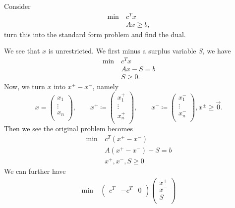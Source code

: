 \begin{eg}
	Consider
	\begin{align*}
		\min~ & c^Tx       \\
		      & Ax \geq b,
	\end{align*}
	turn this into the standard form problem and find the dual.

	We see that \(x\) is unrestricted. We first minus a surplus variable \(S\), we have
	\begin{align*}
		\min~ & c^Tx      \\
		      & Ax - S= b \\
		      & S \geq 0.
	\end{align*}
	Now, we turn \(x\) into \(x^+ - x^-\), namely
	\[
		x = \begin{pmatrix}
			x_1    \\
			\vdots \\
			x_n    \\
		\end{pmatrix},\qquad
		x^+ \coloneqq \begin{pmatrix}
			x^+_1  \\
			\vdots \\
			x^+_n  \\
		\end{pmatrix},\qquad
		x^- \coloneqq \begin{pmatrix}
			x^-_1  \\
			\vdots \\
			x^-_n  \\
		\end{pmatrix}, x^\pm \geq \vec{0}.
	\]
	Then we see the original problem becomes
	\begin{align*}
		\min~ & c^T(x^+ - x^-)       \\
		      & A(x^+ - x^-) - S = b \\
		      & x^+, x^-, S \geq 0
	\end{align*}
	\hr
	We can further have
	\begin{align*}
		\min~ & \begin{pmatrix}
			        c^{T} & -c^{T} & 0 \\
		        \end{pmatrix}\begin{pmatrix}
			                     x^+ \\
			                     x^- \\
			                     S   \\
		                     \end{pmatrix}    \\

\end{align*}
\end{eg}
